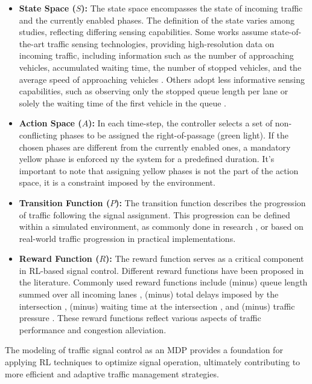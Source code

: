 \begin{itemize}
  \item \textbf{State Space ($S$):} The state space encompasses the state of incoming traffic and the currently enabled phases. The definition of the state varies among studies, reflecting differing sensing capabilities. Some works assume state-of-the-art traffic sensing technologies, providing high-resolution data on incoming traffic, including information such as the number of approaching vehicles, accumulated waiting time, the number of stopped vehicles, and the average speed of approaching vehicles \cite{chen2020toward}. Others adopt less informative sensing capabilities, such as observing only the stopped queue length per lane \cite{ma2020feudal} or solely the waiting time of the first vehicle in the queue \cite{shabestary2018deep}.

  \item \textbf{Action Space ($A$):} In each time-step, the controller selects a set of non-conflicting phases to be assigned the right-of-passage (green light). If the chosen phases are different from the currently enabled ones, a mandatory yellow phase is enforced ny the system for a predefined duration. It's important to note that assigning yellow phases is not the part of the action space, it is a constraint imposed by the environment.

  \item \textbf{Transition Function ($P$):} The transition function describes the progression of traffic following the signal assignment. This progression can be defined within a simulated environment, as commonly done in research \cite{ma2020feudal}, or based on real-world traffic progression in practical implementations.

  \item \textbf{Reward Function ($R$):} The reward function serves as a critical component in RL-based signal control. Different reward functions have been proposed in the literature. Commonly used reward functions include (minus) queue length summed over all incoming lanes \cite{wiering2000multi}, (minus) total delays imposed by the intersection \cite{shabestary2018deep}, (minus) waiting time at the intersection \cite{ma2020feudal}, and (minus) traffic pressure \cite{chen2020toward}. These reward functions reflect various aspects of traffic performance and congestion alleviation.

\end{itemize}

The modeling of traffic signal control as an MDP provides a foundation for applying RL techniques to optimize signal operation, ultimately contributing to more efficient and adaptive traffic management strategies.

